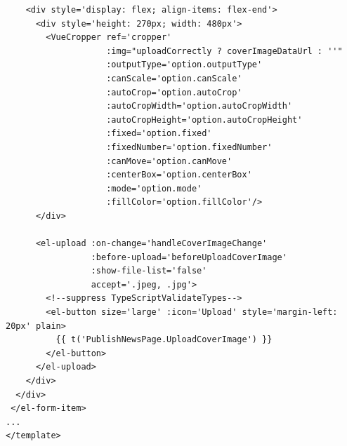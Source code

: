 \begin{itemize}
\begin{verbatim}
    <div style='display: flex; align-items: flex-end'>
      <div style='height: 270px; width: 480px'>
        <VueCropper ref='cropper'
                    :img="uploadCorrectly ? coverImageDataUrl : ''"
                    :outputType='option.outputType'
                    :canScale='option.canScale'
                    :autoCrop='option.autoCrop'
                    :autoCropWidth='option.autoCropWidth'
                    :autoCropHeight='option.autoCropHeight'
                    :fixed='option.fixed'
                    :fixedNumber='option.fixedNumber'
                    :canMove='option.canMove'
                    :centerBox='option.centerBox'
                    :mode='option.mode'
                    :fillColor='option.fillColor'/>
      </div>
	
      <el-upload :on-change='handleCoverImageChange'
                 :before-upload='beforeUploadCoverImage'
                 :show-file-list='false'
                 accept='.jpeg, .jpg'>
        <!--suppress TypeScriptValidateTypes-->
        <el-button size='large' :icon='Upload' style='margin-left: 20px' plain>
          {{ t('PublishNewsPage.UploadCoverImage') }}
        </el-button>
      </el-upload>
    </div>
  </div>
 </el-form-item>
...
</template>
	\end{verbatim}
\end{itemize}

